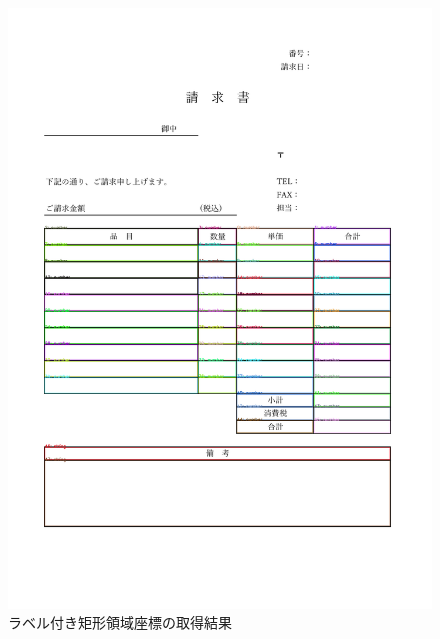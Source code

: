 \begin{figure}[t]
    \begin{center}
        \includegraphics[width=15cm]{image/05-indication/rects_with_label.png}
        \caption{ラベル付き矩形領域座標の取得結果}
        \label{fig:rects_with_label}
    \end{center}
\end{figure}

